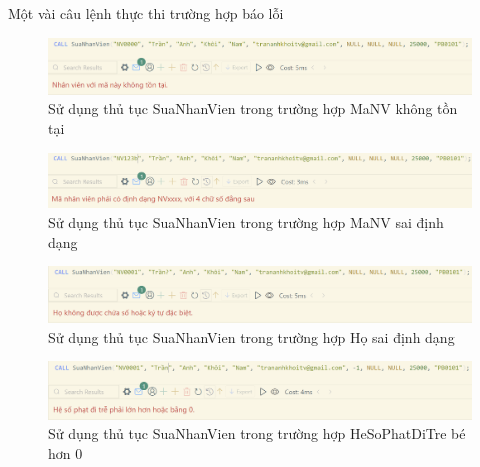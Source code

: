 \newpage
Một vài câu lệnh thực thi trường hợp báo lỗi
\begin{figure}[H]
    \centering
    \includegraphics[width=\linewidth]{content/images/SuaNhanVien_MaNVKhongTonTai.png}
    \caption{Sử dụng thủ tục SuaNhanVien trong trường hợp MaNV không tồn tại}
    \label{fig:SuaNhanVien_MaNVKhongTonTai}
\end{figure}
\begin{figure}[H]
    \centering
    \includegraphics[width=\linewidth]{content/images/SuaNhanVien_MaNVFail.png}
    \caption{Sử dụng thủ tục SuaNhanVien trong trường hợp MaNV sai định dạng}
    \label{fig:SuaNhanVien_MaNVFail}
\end{figure}
\begin{figure}[H]
    \centering
    \includegraphics[width=\linewidth]{content/images/SuaNhanVien_HoSaiDinhDang.png}
    \caption{Sử dụng thủ tục SuaNhanVien trong trường hợp Họ sai định dạng}
    \label{fig:SuaNhanVien_HoSaiDinhDang}
\end{figure}
\begin{figure}[H]
    \centering
    \includegraphics[width=\linewidth]{content/images/SuaNhanVien_HeSoTreFail.png}
    \caption{Sử dụng thủ tục SuaNhanVien trong trường hợp HeSoPhatDiTre bé hơn 0}
    \label{fig:SuaNhanVien_HeSoTreFail}
\end{figure}

